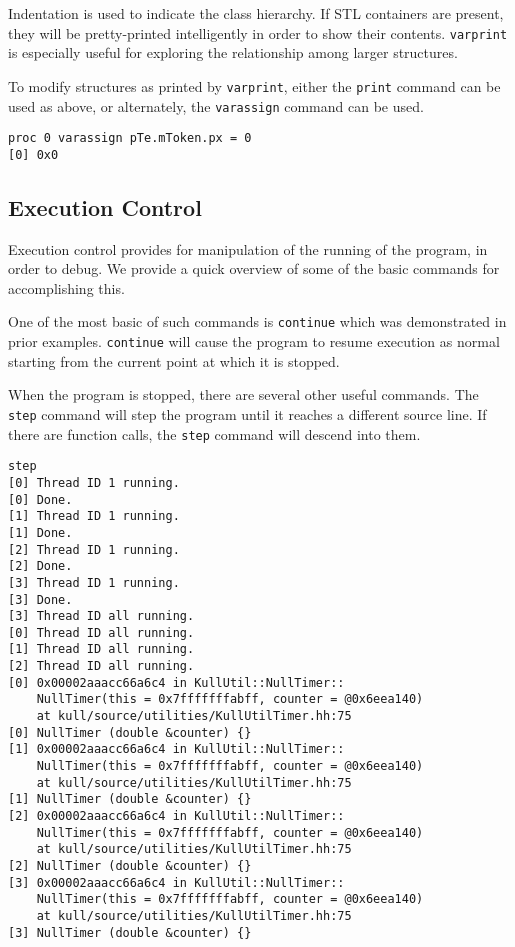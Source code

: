 \documentclass{refart}
\begin{document}
Indentation is used to indicate the class hierarchy. If STL containers are present, they will be pretty-printed intelligently in order to show their contents. \texttt{varprint} is especially useful for exploring the relationship among larger structures.

To modify structures as printed by \texttt{varprint}, either the \texttt{print} command can be used as above, or alternately, the \texttt{varassign} command can be used.

\begin{Verbatim}
proc 0 varassign pTe.mToken.px = 0
[0] 0x0
\end{Verbatim}

\subsection{Execution Control}

Execution control provides for manipulation of the running of the program, in order to debug. We provide a quick overview of some of the basic commands for accomplishing this.

One of the most basic of such commands is \texttt{continue} which was demonstrated in prior examples. \texttt{continue} will cause the program to resume execution as normal starting from the current point at which it is stopped.

When the program is stopped, there are several other useful commands. The \texttt{step} command will step the program until it reaches a different source line. If there are function calls, the \texttt{step} command will descend into them.

\begin{Verbatim}
step
[0] Thread ID 1 running.
[0] Done.
[1] Thread ID 1 running.
[1] Done.
[2] Thread ID 1 running.
[2] Done.
[3] Thread ID 1 running.
[3] Done.
[3] Thread ID all running.
[0] Thread ID all running.
[1] Thread ID all running.
[2] Thread ID all running.
[0] 0x00002aaacc66a6c4 in KullUtil::NullTimer::
    NullTimer(this = 0x7fffffffabff, counter = @0x6eea140)
    at kull/source/utilities/KullUtilTimer.hh:75
[0] NullTimer (double &counter) {}
[1] 0x00002aaacc66a6c4 in KullUtil::NullTimer::
    NullTimer(this = 0x7fffffffabff, counter = @0x6eea140)
    at kull/source/utilities/KullUtilTimer.hh:75
[1] NullTimer (double &counter) {}
[2] 0x00002aaacc66a6c4 in KullUtil::NullTimer::
    NullTimer(this = 0x7fffffffabff, counter = @0x6eea140)
    at kull/source/utilities/KullUtilTimer.hh:75
[2] NullTimer (double &counter) {}
[3] 0x00002aaacc66a6c4 in KullUtil::NullTimer::
    NullTimer(this = 0x7fffffffabff, counter = @0x6eea140)
    at kull/source/utilities/KullUtilTimer.hh:75
[3] NullTimer (double &counter) {}
\end{Verbatim}
\end{document}
